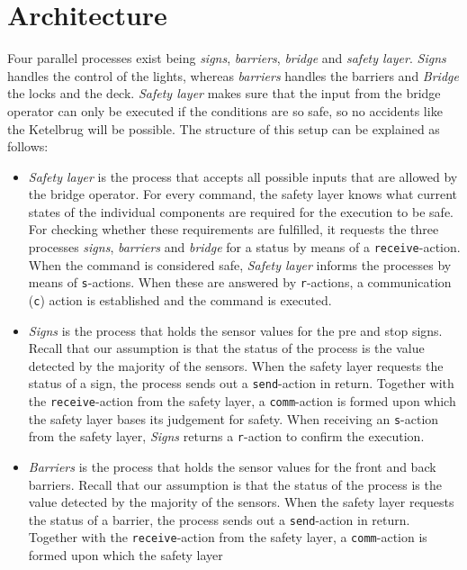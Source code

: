 \section{Architecture}
\label{sec:arch}

Four parallel processes exist being \emph{signs}, \emph{barriers}, \emph{bridge} and \emph{safety layer}. \emph{Signs} handles the control of the lights, whereas \emph{barriers} handles the barriers and \emph{Bridge} the locks and the deck. \emph{Safety layer} makes sure that the input from the bridge operator can only be executed if the conditions are so safe, so no accidents like the Ketelbrug will be possible. The structure of this setup can be explained as follows:
%
\begin{itemize}
	\item \emph{Safety layer} is the process that accepts all possible inputs
		that are allowed by the bridge operator. For every command, the safety
		layer knows what current states of the individual components are
		required for the execution to be safe. For checking whether these
		requirements are fulfilled, it requests the three processes
		\emph{signs}, \emph{barriers} and \emph{bridge} for a status by means
		of a \texttt{receive}-action.  When the command is considered safe,
		\emph{Safety layer} informs the processes by means of
		\texttt{s}-actions. When these are answered by \texttt{r}-actions, a
		communication (\texttt{c}) action is established and the command is
		executed.
	\item \emph{Signs} is the process that holds the sensor values for the pre and stop signs. Recall that our assumption is that the status of the process is the value detected by the majority of the sensors. When the safety layer
	requests the status of a sign, the process sends out a \texttt{send}-action in return. Together with the \texttt{receive}-action from the safety layer, a \texttt{comm}-action is formed upon which the safety layer bases its
	judgement for safety. When receiving an \texttt{s}-action from the safety layer, \emph{Signs} returns a \texttt{r}-action to confirm the execution.
	\item \emph{Barriers} is the process that holds the sensor values for the front and back barriers. Recall that our assumption is that the status of the process is the value detected by the majority of the sensors. When the
	safety layer requests the status of a barrier, the process sends out a \texttt{send}-action in return. Together with the \texttt{receive}-action from the safety layer, a \texttt{comm}-action is formed upon which the safety layer

\end{itemize}
